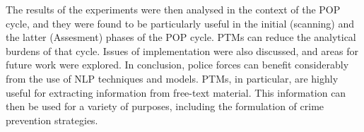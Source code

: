 The results of the experiments were then analysed in the context of the POP cycle, and they were found to be particularly useful in the initial (scanning) and the latter (Assesment) phases of the POP cycle. PTMs can reduce the analytical burdens of that cycle. Issues of implementation were also discussed, and areas for future work were explored. In conclusion, police forces can benefit considerably from the use of NLP techniques and models. PTMs, in particular, are highly useful for extracting information from free-text material. This information can then be used for a variety of purposes, including the formulation of crime prevention strategies.






